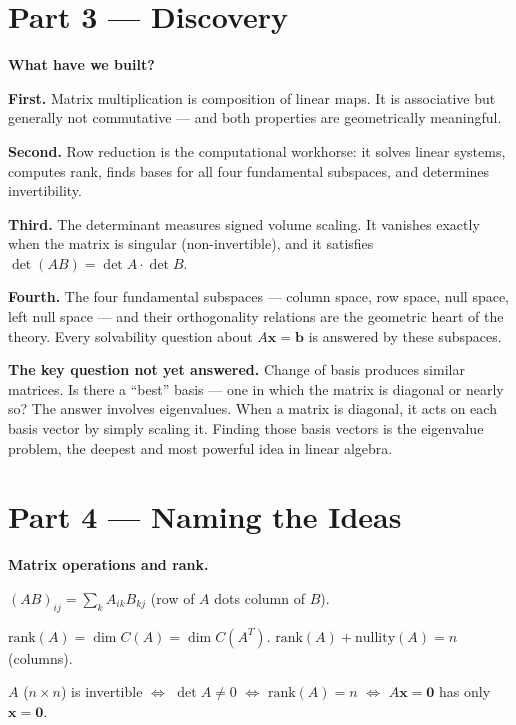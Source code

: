 \documentclass[12pt, a4paper]{article}
\newcounter{problem}
\begin{document}
\section{Part 3 \texorpdfstring{---}{--} Discovery}

\begin{discoverybox}
\textbf{What have we built?}

\textbf{First.} Matrix multiplication is composition of linear maps. It is associative but generally not commutative --- and both properties are geometrically meaningful.

\textbf{Second.} Row reduction is the computational workhorse: it solves linear systems, computes rank, finds bases for all four fundamental subspaces, and determines invertibility.

\textbf{Third.} The determinant measures signed volume scaling. It vanishes exactly when the matrix is singular (non-invertible), and it satisfies $\det(AB) = \det A \cdot \det B$.

\textbf{Fourth.} The four fundamental subspaces --- column space, row space, null space, left null space --- and their orthogonality relations are the geometric heart of the theory. Every solvability question about $A\mathbf{x} = \mathbf{b}$ is answered by these subspaces.

\medskip
\textbf{The key question not yet answered.} Change of basis produces similar matrices. Is there a ``best'' basis --- one in which the matrix is diagonal or nearly so? The answer involves eigenvalues. When a matrix is diagonal, it acts on each basis vector by simply scaling it. Finding those basis vectors is the eigenvalue problem, the deepest and most powerful idea in linear algebra.
\end{discoverybox}

\section{Part 4 \texorpdfstring{---}{--} Naming the Ideas}

\begin{namebox}
\textbf{Matrix operations and rank.}

$(AB)_{ij} = \sum_k A_{ik}B_{kj}$ (row of $A$ dots column of $B$).

$\text{rank}(A) = \dim C(A) = \dim C(A^T)$. \quad $\text{rank}(A) + \text{nullity}(A) = n$ (columns).

$A$ ($n\times n$) is invertible $\iff$ $\det A \neq 0$ $\iff$ $\text{rank}(A) = n$ $\iff$ $A\mathbf{x}=\mathbf{0}$ has only $\mathbf{x}=\mathbf{0}$.
\end{namebox}
\end{document}
